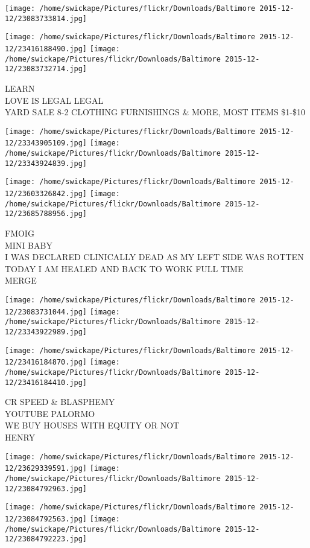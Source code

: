 \documentclass[10pt,letterpaper]{article}
\begin{document}
\texttt{[image: /home/swickape/Pictures/flickr/Downloads/Baltimore 2015-12-12/23083733814.jpg]}

\vspace{0.25in}
\texttt{[image: /home/swickape/Pictures/flickr/Downloads/Baltimore 2015-12-12/23416188490.jpg]}
\texttt{[image: /home/swickape/Pictures/flickr/Downloads/Baltimore 2015-12-12/23083732714.jpg]}

LEARN\\
LOVE IS LEGAL LEGAL\\
YARD SALE 8{-}2 CLOTHING FURNISHINGS \& MORE, MOST ITEMS \$1{-}\$10
\pagebreak

\texttt{[image: /home/swickape/Pictures/flickr/Downloads/Baltimore 2015-12-12/23343905109.jpg]}
\texttt{[image: /home/swickape/Pictures/flickr/Downloads/Baltimore 2015-12-12/23343924839.jpg]}

\texttt{[image: /home/swickape/Pictures/flickr/Downloads/Baltimore 2015-12-12/23603326842.jpg]}
\texttt{[image: /home/swickape/Pictures/flickr/Downloads/Baltimore 2015-12-12/23685788956.jpg]}

FMOIG\\
MINI BABY\\
I WAS DECLARED CLINICALLY DEAD AS MY LEFT SIDE WAS ROTTEN TODAY I AM HEALED AND BACK TO WORK FULL TIME\\
MERGE
\pagebreak

\texttt{[image: /home/swickape/Pictures/flickr/Downloads/Baltimore 2015-12-12/23083731044.jpg]}
\texttt{[image: /home/swickape/Pictures/flickr/Downloads/Baltimore 2015-12-12/23343922989.jpg]}

\texttt{[image: /home/swickape/Pictures/flickr/Downloads/Baltimore 2015-12-12/23416184870.jpg]}
\texttt{[image: /home/swickape/Pictures/flickr/Downloads/Baltimore 2015-12-12/23416184410.jpg]}

CR SPEED \& BLASPHEMY\\
YOUTUBE PALORMO\\
WE BUY HOUSES WITH EQUITY OR NOT\\
HENRY
\pagebreak

\texttt{[image: /home/swickape/Pictures/flickr/Downloads/Baltimore 2015-12-12/23629339591.jpg]}
\texttt{[image: /home/swickape/Pictures/flickr/Downloads/Baltimore 2015-12-12/23084792963.jpg]}

\texttt{[image: /home/swickape/Pictures/flickr/Downloads/Baltimore 2015-12-12/23084792563.jpg]}
\texttt{[image: /home/swickape/Pictures/flickr/Downloads/Baltimore 2015-12-12/23084792223.jpg]}
\end{document}
